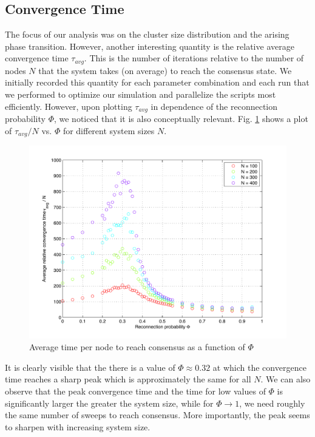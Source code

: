 \documentclass[11pt]{article}
\begin{document}
\subsection{Convergence Time}

The focus of our analysis was on the cluster size distribution and the arising phase transition. However, another interesting quantity is the relative average convergence time $\tau_{avg}$. This is the number of iterations relative to the number of nodes $N$ that the system takes (on average) to reach the consensus state. We initially recorded this quantity for each parameter combination and each run that we performed to optimize our simulation and parallelize the scripts most efficiently. However, upon plotting $\tau_{avg}$ in dependence of the reconnection probability $\Phi$, we noticed that it is also conceptually relevant. Fig. \ref{Fig:tau} shows a plot of $\tau_{avg}/N$ vs. $\Phi$ for different system sizes $N$.

\begin{figure}[h!]
  \centering
    \includegraphics[scale=0.8]{Plots/tau.pdf}
  \caption{Average time per node to reach consensus as a function of $\Phi$}
  \label{Fig:tau}
\end{figure}

It is clearly visible that the there is a value of $\Phi \approx 0.32$ at which the convergence time reaches a sharp peak which is approximately the same for all $N$. We can also observe that the peak convergence time and the time for low values of $\Phi$ is significantly larger the greater the system size, while for $\Phi \rightarrow 1$, we need roughly the same number of sweeps to reach consensus. More importantly, the peak seems to sharpen with increasing system size. \\
\end{document}
